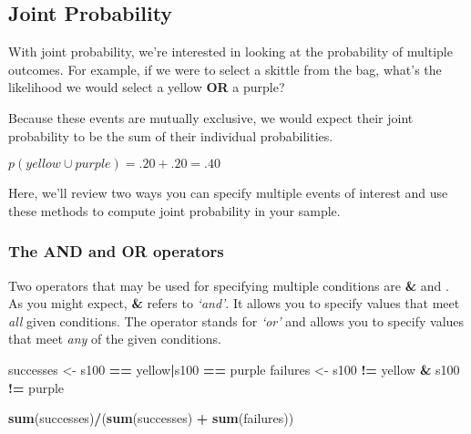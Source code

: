 \documentclass[
]{article}
\newenvironment{Shaded}{\begin{snugshade}}{\end{snugshade}}
\newcommand{\FunctionTok}[1]{\textcolor[rgb]{0.13,0.29,0.53}{\textbf{#1}}}
\newcommand{\NormalTok}[1]{#1}
\newcommand{\OtherTok}[1]{\textcolor[rgb]{0.56,0.35,0.01}{#1}}
\newcommand{\SpecialCharTok}[1]{\textcolor[rgb]{0.81,0.36,0.00}{\textbf{#1}}}
\newcommand{\StringTok}[1]{\textcolor[rgb]{0.31,0.60,0.02}{#1}}
\begin{document}
\subsection{Joint Probability}\label{joint-probability}

With joint probability, we're interested in looking at the probability
of multiple outcomes. For example, if we were to select a skittle from
the bag, what's the likelihood we would select a yellow \textbf{OR} a
purple?

Because these events are mutually exclusive, we would expect their joint
probability to be the sum of their individual probabilities.

\(p(yellow\cup purple)=.20 + .20 = .40\)

Here, we'll review two ways you can specify multiple events of interest
and use these methods to compute joint probability in your sample.

\subsubsection{The AND and OR operators}\label{the-and-and-or-operators}

Two operators that may be used for specifying multiple conditions are
\textbf{\&} and \textbf{\textbar{}}. As you might expect, \textbf{\&}
refers to \emph{`and'}. It allows you to specify values that meet
\emph{all} given conditions. The \textbf{\textbar{}} operator stands for
\emph{`or'} and allows you to specify values that meet \emph{any} of the
given conditions.

\begin{Shaded}
\begin{Highlighting}[]
\NormalTok{successes }\OtherTok{\textless{}{-}}\NormalTok{ s100 }\SpecialCharTok{==} \StringTok{\textquotesingle{}yellow\textquotesingle{}}\SpecialCharTok{|}\NormalTok{s100 }\SpecialCharTok{==} \StringTok{\textquotesingle{}purple\textquotesingle{}}
\NormalTok{failures }\OtherTok{\textless{}{-}}\NormalTok{ s100 }\SpecialCharTok{!=} \StringTok{\textquotesingle{}yellow\textquotesingle{}} \SpecialCharTok{\&}\NormalTok{ s100 }\SpecialCharTok{!=} \StringTok{\textquotesingle{}purple\textquotesingle{}}

\FunctionTok{sum}\NormalTok{(successes)}\SpecialCharTok{/}\NormalTok{(}\FunctionTok{sum}\NormalTok{(successes) }\SpecialCharTok{+} \FunctionTok{sum}\NormalTok{(failures))}
\end{Highlighting}
\end{Shaded}
\end{document}
